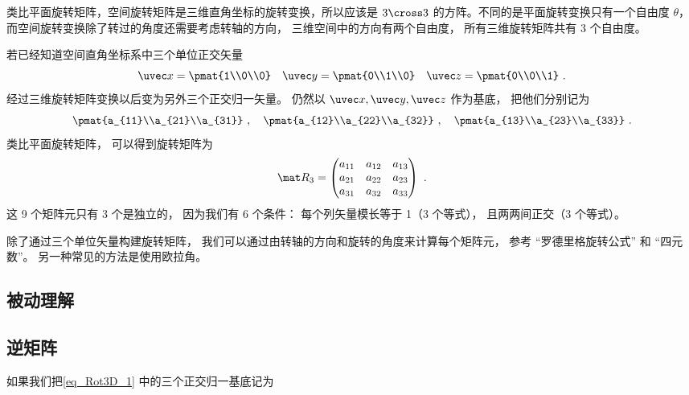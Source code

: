 
\begin{issues}
\issueDraft
\end{issues}


类比平面旋转矩阵，空间旋转矩阵是三维直角坐标的旋转变换，所以应该是 $3 \cross 3$ 的方阵。不同的是平面旋转变换只有一个自由度 $\theta $， 而空间旋转变换除了转过的角度还需要考虑转轴的方向， 三维空间中的方向有两个自由度， 所有三维旋转矩阵共有 3 个自由度。

若已经知道空间直角坐标系中三个单位正交矢量
\begin{equation}
\uvec x=\pmat{1\\0\\0} \quad \uvec y=\pmat{0\\1\\0} \quad \uvec z=\pmat{0\\0\\1}~.
\end{equation}
经过三维旋转矩阵变换以后变为另外三个正交归一矢量。 仍然以 $\uvec x, \uvec y, \uvec z$ 作为基底， 把他们分别记为
\begin{equation}\label{eq_Rot3D_1}
\pmat{a_{11}\\a_{21}\\a_{31}} ~,\quad \pmat{a_{12}\\a_{22}\\a_{32}} ~,\quad \pmat{a_{13}\\a_{23}\\a_{33}}~.
\end{equation}
类比平面旋转矩阵， 可以得到旋转矩阵为
\begin{equation}
\mat R_3 = \begin{pmatrix}
{a_{11}}&{a_{12}}&{a_{13}}\\
{a_{21}}&{a_{22}}&{a_{23}}\\
{a_{31}}&{a_{32}}&{a_{33}}
\end{pmatrix}~.\end{equation}
这 9 个矩阵元只有 3 个是独立的， 因为我们有 6 个条件： 每个列矢量模长等于 1（3 个等式）， 且两两间正交（3 个等式）。

除了通过三个单位矢量构建旋转矩阵， 我们可以通过由转轴的方向和旋转的角度来计算每个矩阵元， 参考 “罗德里格旋转公式” 和 “四元数”。 另一种常见的方法是使用欧拉角。


\subsection{被动理解}


\subsection{逆矩阵}
如果我们把\autoref{eq_Rot3D_1} 中的三个正交归一基底记为 

